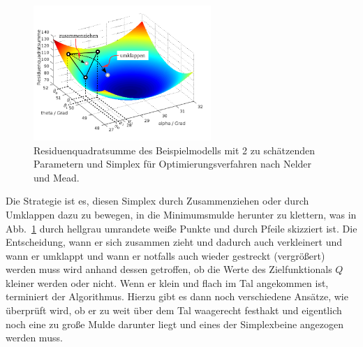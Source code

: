 \begin{figure}
\begin{center}
\includegraphics[width=0.6\textwidth, angle = 0]{03_vorlesung/media/LSopti_example1_LS_NM.pdf}
\end{center}
\caption{Residuenquadratsumme des Beispielmodells mit 2 zu schätzenden Parametern
und Simplex für Optimierungsverfahren nach Nelder und Mead.\label{LSoptiExample1NM}}
\end{figure}

Die Strategie ist es, diesen Simplex durch Zusammenziehen oder durch Umklappen dazu zu bewegen, in
die Minimumsmulde herunter zu klettern, was in Abb.~\ref{LSoptiExample1NM} durch hellgrau umrandete
weiße Punkte und durch Pfeile skizziert ist. Die Entscheidung, wann er sich zusammen zieht und dadurch
auch verkleinert und wann er umklappt und wann er notfalls auch wieder gestreckt (vergrößert) werden
muss wird anhand dessen getroffen, ob die Werte des Zielfunktionals $Q$ kleiner werden oder nicht.
Wenn er klein und flach im Tal angekommen ist, terminiert der Algorithmus. Hierzu gibt es dann noch
verschiedene Ansätze, wie überprüft wird, ob er zu weit über dem Tal waagerecht festhakt und eigentlich
noch eine zu große Mulde darunter liegt und eines der Simplexbeine angezogen werden muss.

